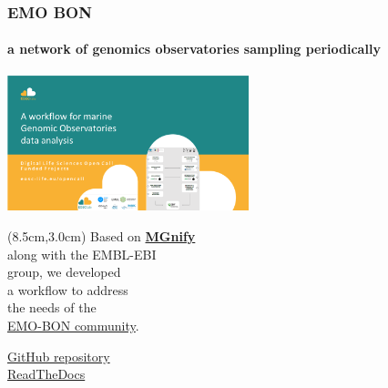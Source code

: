 \documentclass{beamer}
\begin{document}
   \begin{frame}
      \frametitle{EMO BON }
      \framesubtitle{a network of genomics observatories sampling periodically}
      \includegraphics[width=70mm]{resources/marine-genomic-observatories.png}


      \begin{textblock*}{5cm}(8.5cm,3.0cm) %
         Based on \textbf{\href{https://www.ebi.ac.uk/metagenomics}{MGnify}} \\
         along with the EMBL-EBI \\ 
         group, we developed \\ 
         a workflow to address\\
         the needs of the \\
         \href{https://www.embrc.eu/services/emo-bon}{EMO-BON community}.

         \bigskip
         
         \footnotesize
         \href{https://github.com/emo-bon/pipeline-v5}{GitHub repository} \\
         \href{https://metagoflow.readthedocs.io/en/latest/}{ReadTheDocs}

      \end{textblock*}
   \end{frame}



\end{document}
